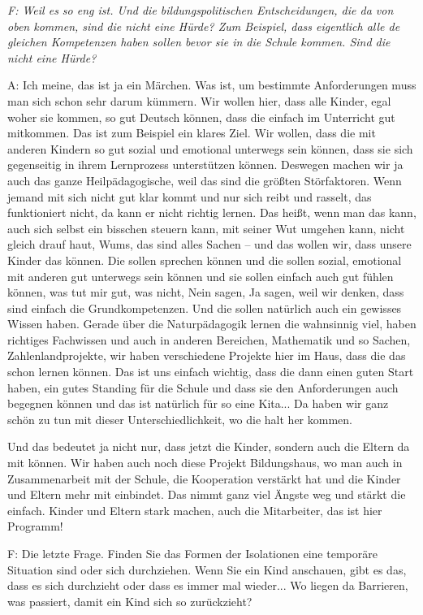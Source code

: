 \begin{linenumbers}
\emph{F: Weil es so eng ist.
Und die bildungspolitischen Entscheidungen, die da von oben kommen, sind die nicht eine Hürde? Zum Beispiel, dass eigentlich alle de gleichen Kompetenzen haben sollen bevor sie in die Schule kommen. Sind die nicht eine Hürde?} 

A: Ich meine, das ist ja ein Märchen. Was ist, um bestimmte Anforderungen muss man sich schon sehr darum kümmern. Wir wollen hier, dass alle Kinder, egal woher sie kommen, so gut Deutsch können, dass die einfach im Unterricht gut mitkommen. Das ist zum Beispiel ein klares Ziel. Wir wollen, dass die mit anderen Kindern so gut sozial und emotional unterwegs sein können, dass sie sich gegenseitig in ihrem Lernprozess unterstützen können. Deswegen machen wir ja auch das ganze Heilpädagogische, weil das sind die größten Störfaktoren. Wenn jemand mit sich nicht gut klar kommt und nur sich reibt und rasselt, das funktioniert nicht, da kann er nicht richtig lernen. Das heißt, wenn man das kann, auch sich selbst ein bisschen steuern kann, mit seiner Wut umgehen kann, nicht gleich drauf haut, Wums, das sind alles Sachen -- und das wollen wir, dass unsere Kinder das können. Die sollen sprechen können und die sollen sozial, emotional mit anderen gut unterwegs sein können und sie sollen einfach auch gut fühlen können, was tut mir gut, was nicht, Nein sagen, Ja sagen, weil wir denken, dass sind einfach die Grundkompetenzen. 
Und die sollen natürlich auch ein gewisses Wissen haben. Gerade über die Naturpädagogik lernen die wahnsinnig viel, haben richtiges Fachwissen und auch in anderen Bereichen, Mathematik und so Sachen, Zahlenlandprojekte, wir haben verschiedene Projekte hier im Haus, dass die das schon lernen können. Das ist uns einfach wichtig, dass die dann einen guten Start haben, ein gutes Standing für die Schule und dass sie den Anforderungen auch begegnen können und das ist natürlich für so eine Kita... Da haben wir ganz schön zu tun mit dieser Unterschiedlichkeit, wo die halt her kommen. 

Und das bedeutet ja nicht nur, dass jetzt die Kinder, sondern auch die Eltern da mit können. Wir haben auch noch diese Projekt Bildungshaus, wo man auch in Zusammenarbeit mit der Schule, die Kooperation verstärkt hat und die Kinder und Eltern mehr mit einbindet. Das nimmt ganz viel Ängste weg und stärkt die einfach. Kinder und Eltern stark machen, auch die Mitarbeiter, das ist hier Programm!

F: Die letzte Frage. Finden Sie das Formen der Isolationen eine temporäre Situation sind oder sich durchziehen. Wenn Sie ein Kind anschauen, gibt es das, dass es sich durchzieht oder dass es immer mal wieder... Wo liegen da Barrieren, was passiert, damit ein Kind sich so zurückzieht? 


\end{linenumbers}
